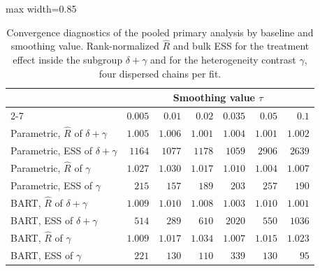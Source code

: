 \documentclass[11pt]{article}
\theoremstyle{definition}
\theoremstyle{plain}
\begin{document}
\begin{table}[!htbp]
  \centering
  \caption{Convergence diagnostics of the pooled primary analysis by baseline and smoothing value. Rank-normalized $\widehat R$ and bulk ESS for the treatment effect inside the subgroup $\delta+\gamma$ and for the heterogeneity contrast $\gamma$, four dispersed chains per fit.}
  \label{tab:premier_primary_diag}
  \begin{adjustbox}{max width=0.85\textwidth}
  \begin{tabular}{lrrrrrr}
    \toprule
    & \multicolumn{6}{c}{Smoothing value $\tau$}\\
    \cmidrule(lr){2-7}
    & $0.005$ & $0.01$ & $0.02$ & $0.035$ & $0.05$ & $0.1$\\
    \midrule
    Parametric, $\widehat R$ of $\delta+\gamma$ & $1.005$ & $1.006$ & $1.001$ & $1.004$ & $1.001$ & $1.002$\\
    Parametric, ESS of $\delta+\gamma$ & $1164$ & $1077$ & $1178$ & $1059$ & $2906$ & $2639$\\
    Parametric, $\widehat R$ of $\gamma$ & $1.027$ & $1.030$ & $1.017$ & $1.010$ & $1.004$ & $1.007$\\
    Parametric, ESS of $\gamma$ & $215$ & $157$ & $189$ & $203$ & $257$ & $190$\\
    BART, $\widehat R$ of $\delta+\gamma$ & $1.009$ & $1.010$ & $1.008$ & $1.003$ & $1.010$ & $1.001$\\
    BART, ESS of $\delta+\gamma$ & $514$ & $289$ & $610$ & $2020$ & $550$ & $1036$\\
    BART, $\widehat R$ of $\gamma$ & $1.009$ & $1.017$ & $1.034$ & $1.007$ & $1.015$ & $1.023$\\
    BART, ESS of $\gamma$ & $221$ & $130$ & $110$ & $339$ & $130$ & $95$\\
    \bottomrule
  \end{tabular}
  \end{adjustbox}
\end{table}
\end{document}

